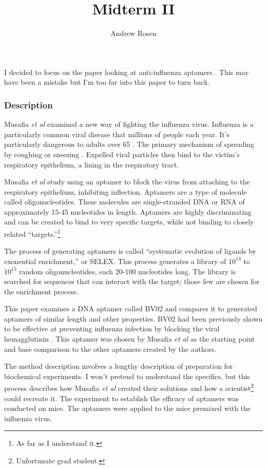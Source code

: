 \documentclass[10pt,a4paper]{article}
\author{Andrew Rosen}
\title{Midterm II}
\begin{document}
	\maketitle
	
	I decided to focus on the paper looking at anti-influenza aptamers  \cite{musafia2014designing}.
	This may have been a mistake but I'm too far into this paper to turn back.
	
	\subsubsection*{Description}
	
	Musafia \textit{et al} examined a new way of fighting the influenza virus.
	Influenza is a particularly common viral disease that millions of people each year.
	It's particularly dangerous to adults over 65 \cite{centers2010estimates}.
	The primary mechanism of spreading  by coughing or sneezing \cite{stephenson2002epidemiology}.
	Expelled viral particles then bind to the victim's respiratory epithelium, a lining in the respiratory tract.
	
	Musafia \textit{et al} study using an aptamer to block the virus from attaching to the respiratory epithelium, inhibiting inflection.
	Aptamers are a type of molecule called oligonucleotides.
	These molecules are single-stranded DNA or RNA of approximately 15-45 nucleotides in length. 
	Aptamers  are highly discriminating and can be created to bind to very specific targets, while not binding to closely related ``targets.''\footnote{As far as I understand it.}
	
	The process of generating aptamers is called ``systematic evolution of ligands by exonential enrichment,'' or SELEX.
	This process generates a library of $ 10^{13} $ to $ 10 ^{15} $ random oligonucleotides, each 20-100 nucleotides long.
	The library is searched for sequences that can interact with the target; those few are chosen for the enrichment process.
	
	This paper examines a DNA aptamer called BV02 and compares it to generated aptamers of similar length and other properties.
	BV02 had been previously shown to be effective at preventing influenza infection by blocking the viral hemagglutinin \cite{jeon2004dna}.
	This aptamer was chosen by Musafia \textit{et al} as the starting point and base comparison to the other aptamers created by the authors.
		
	The method description involves a lengthy description of preparation  for biochemical experiments.  
	I won't pretend to understand the specifics, but this process describes how Musafia \textit{et al}  created their solutions and how a scientist\footnote{Unfortunate grad student.} could recreate it.
	The experiment to establish the efficacy of aptamers was conducted on mice.
	The aptamers were applied to the mice premixed with the influenza virus.
	
\end{document}
